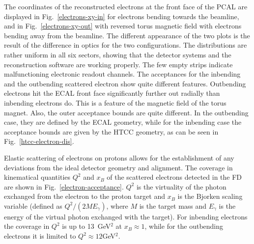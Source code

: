\documentclass[final,3p,twocolumn]{elsarticle}
\begin{document}
The coordinates of the reconstructed electrons at the front face of the PCAL are displayed in
Fig.~\ref{electrons-xy-in} for electrons bending towards the beamline, and in Fig.~\ref{electrons-xy-out} with
reversed torus magnetic field with electrons bending away from the beamline. The different appearance of the two
plots is the result of the difference in optics for the two configurations. The distributions are rather uniform in all
six sectors, showing that the detector systems and the reconstruction software are working properly. The few
empty strips indicate malfunctioning electronic readout channels. The acceptances for the inbending and the
outbending scattered electron show quite different features. Outbending electrons hit the ECAL front face
significantly further out radially than inbending electrons do. This is a feature of the magnetic field of the torus
magnet.  Also, the outer acceptance bounds are quite different. In the outbending case, they are defined by the
ECAL geometry, while for the inbending case the acceptance bounds are given by the HTCC geometry, as can be
seen in Fig.~\ref{htcc-electron-dis}.      

Elastic scattering  of electrons on protons allows for the establishment of any deviations from the ideal detector
geometry and alignment. The coverage in kinematical quantities $Q^2$ and $x_B$ of the scattered electrons
detected in the FD are shown in Fig.~\ref{electron-acceptance}. $Q^2$ is the virtuality of the photon exchanged
from the electron to the proton target and $x_B$ is the Bjorken scaling variable (defined as $Q^2/(2 M E_\gamma)$,
where $M$ is the target mass and $E_\gamma$ is the energy of the virtual photon exchanged with the target). For
inbending electrons the coverage in $Q^2$ is up to 13~GeV$^2$ at $x_B \approx 1$, while for the outbending
electrons it is limited to  $Q^2 \approx 12$GeV$^2$. 
\end{document}
